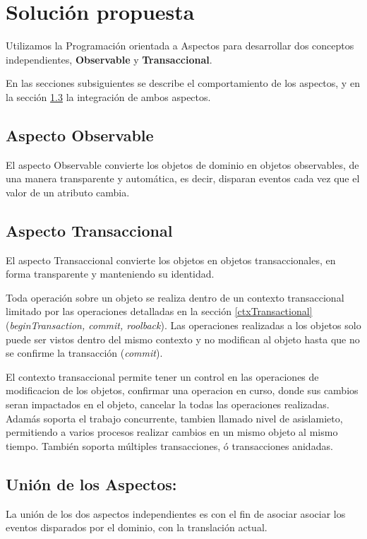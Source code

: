 \section{Solución propuesta}
\label{sec:Solucion}

Utilizamos la Programación orientada a Aspectos para desarrollar dos
conceptos independientes, {\bf Observable} y  {\bf Transaccional}.

En las secciones subsiguientes se describe el comportamiento de los aspectos, y
en la sección \ref{sec:Union} la integración de ambos aspectos.

\subsection{Aspecto Observable}
	El aspecto Observable convierte los objetos de dominio en objetos observables,
	de una manera transparente y automática, es decir, disparan eventos cada vez
	que el valor de un atributo cambia.

\subsection{Aspecto Transaccional}
	El aspecto Transaccional convierte los objetos en objetos
	transaccionales, en forma transparente  y manteniendo su identidad.
	
	Toda operación sobre un objeto se realiza dentro de un contexto transaccional
	limitado por las operaciones detalladas en la sección
	\ref{ctxTransactional} (\emph{beginTransaction, commit, roolback}).
	Las operaciones realizadas a los objetos solo puede ser
	vistos dentro del mismo contexto y no modifican al objeto hasta que no se
	confirme la transacción (\emph{commit}).
	 
	El contexto transaccional permite tener un control en las operaciones de
	modificacion de los objetos, confirmar una operacion en curso, donde sus
	cambios seran impactados en el objeto, cancelar la todas las operaciones
	realizadas. Adamás soporta el trabajo concurrente, tambien llamado
	nivel de asislamieto, permitiendo a varios procesos realizar cambios en un
	mismo objeto al mismo tiempo. También soporta múltiples transacciones, ó transacciones
	anidadas.
	
	
\subsection{Unión de los Aspectos:}
\label{sec:Union}
La unión de los dos aspectos independientes es con el fin de asociar asociar los
eventos disparados por el dominio, con la translación actual.
 
